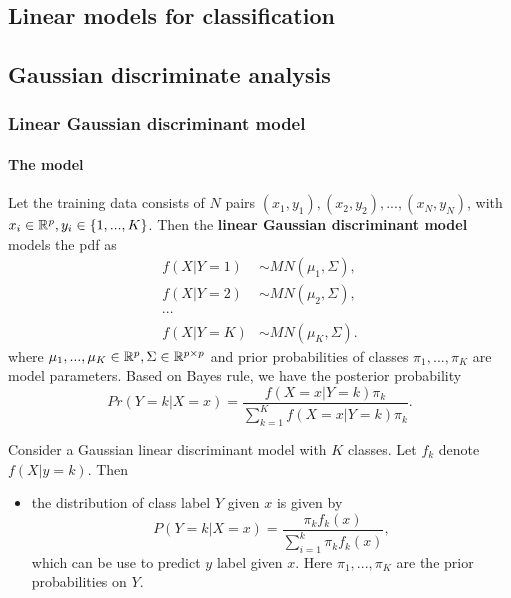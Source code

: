 \begin{refsection}
	\startcontents[chapters]	
	\chapter{Linear models for classification}\label{ch:StatisticalLearning-linear-models}


\section{Gaussian discriminate analysis}





\subsection{Linear Gaussian discriminant model}
\subsubsection{The model}
\begin{definition}\cite[139]{james2013introduction}
	Let the training data consists of $N$ pairs $(x_1,y_1),(x_2,y_2),...,(x_N,y_N)$, with $x_i \in \mathbb{R}^p, y_i \in \{1,...,K\}$. Then the \textbf{linear Gaussian discriminant model} models the pdf as
	\begin{align*}
	f(X|Y=1)&\sim MN(\mu_1,\Sigma),\\
	f(X|Y=2)& \sim MN(\mu_2,\Sigma),\\
	\cdots & \\
	f(X|Y=K)& \sim MN(\mu_K,\Sigma).
	\end{align*}
	where $\mu_1,...,\mu_K\in \mathbb{R}^p, \Sigma\in \mathbb{R}^{p\times p}$ and prior probabilities of classes $\pi_1,...,\pi_K$ are model parameters.
	Based on Bayes rule, we have the posterior probability
	$$Pr(Y = k|X=x) = \frac{f(X=x|Y=k)\pi_k}{\sum_{k=1}^K f(X=x|Y=k)\pi_k}.$$
\end{definition}




\begin{lemma}\cite[106]{murphy2012machine}
	Consider a Gaussian linear discriminant model with $K$ classes. Let $f_k$ denote $f(X|y=k)$. Then
	\begin{itemize}
		\item the distribution of class label $Y$ given $x$ is given by
		$$P(Y=k|X=x) = \frac{\pi_k f_k(x)}{\sum_{i=1}^{k}\pi_k f_k(x)},$$
		which can be use to predict $y$ label given $x$. Here $\pi_1,...,\pi_K$ are the prior probabilities on $Y$. 
	\end{itemize}	
\end{lemma}




\end{refsection}
